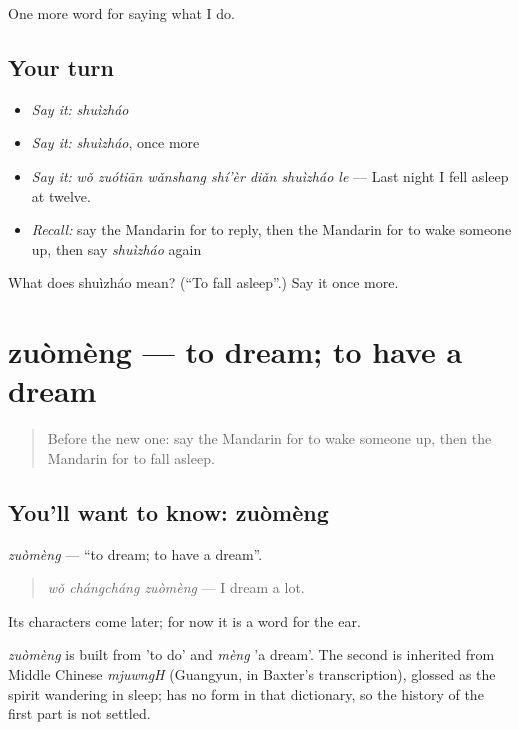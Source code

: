 \begin{grammarlens}[title={What you've built}]
One more word for saying what I do.
\end{grammarlens}

\subsection*{Your turn}
\begin{itemize}
\raggedright
  \item \emph{Say it:} \emph{shuìzháo}
  \item \emph{Say it:} \emph{shuìzháo}, once more
  \item \emph{Say it:} \emph{wǒ zuótiān wǎnshang shí'èr diǎn shuìzháo le} — Last night I fell asleep at twelve.
  \item \emph{Recall:} say the Mandarin for to reply, then the Mandarin for to wake someone up, then say \emph{shuìzháo} again
\end{itemize}

\begin{tcolorbox}[breakable,colback=teal!4,colframe=teal!35!black,title={Before you move on}]
What does shuìzháo mean? (\textquotedblleft{}To fall asleep\textquotedblright{}.) Say it once more.
\end{tcolorbox}
\section[zuòmèng]{zuòmèng — to dream; to have a dream}

\label{lesson:ZH-C158-zuomeng}



\begin{quote}
Before the new one: say the Mandarin for to wake someone up, then the Mandarin for to fall asleep.
\end{quote}

\subsection*{You'll want to know: zuòmèng}
\emph{zuòmèng} — \textquotedblleft{}to dream; to have a dream\textquotedblright{}.

\begin{quote}
\emph{wǒ chángcháng zuòmèng} — I dream a lot.
\end{quote}

Its characters come later; for now it is a word for the ear.

\begin{cousinweb}
\emph{zuòmèng} is built from  'to do' and \emph{mèng} 'a dream'. The second is inherited from Middle Chinese \emph{mjuwngH} (Guangyun, in Baxter's transcription), glossed as the spirit wandering in sleep;  has no form in that dictionary, so the history of the first part is not settled.
\end{cousinweb}

